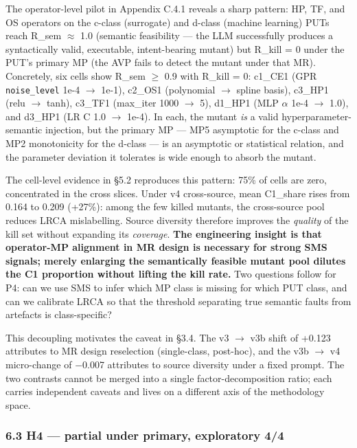 \documentclass[review,12pt,authoryear]{elsarticle}
\begin{document}
The operator-level pilot in Appendix C.4.1 reveals a sharp pattern: HP,
TF, and OS operators on the c-class (surrogate) and d-class (machine
learning) PUTs reach R\_sem $\approx$ 1.0 (semantic feasibility --- the LLM
successfully produces a syntactically valid, executable, intent-bearing
mutant) but R\_kill = 0 under the PUT's primary MP (the AVP fails to
detect the mutant under that MR). Concretely, six cells show R\_sem $\geq$
0.9 with R\_kill = 0: c1\_CE1 (GPR \texttt{noise\_level} 1e-4 $\to$ 1e-1),
c2\_OS1 (polynomial $\to$ spline basis), c3\_HP1 (relu $\to$ tanh), c3\_TF1
(max\_iter 1000 $\to$ 5), d1\_HP1 (MLP $\alpha$ 1e-4 $\to$ 1.0), and d3\_HP1 (LR C 1.0
$\to$ 1e-4). In each, the mutant \emph{is} a valid hyperparameter-semantic
injection, but the primary MP --- MP5 asymptotic for the c-class and MP2
monotonicity for the d-class --- is an asymptotic or statistical
relation, and the parameter deviation it tolerates is wide enough to
absorb the mutant.

The cell-level evidence in §5.2 reproduces this pattern: 75\% of cells
are zero, concentrated in the cross slices. Under v4 cross-source, mean
C1\_share rises from 0.164 to 0.209 (+27\%): among the few killed
mutants, the cross-source pool reduces LRCA mislabelling. Source
diversity therefore improves the \emph{quality} of the kill set without
expanding its \emph{coverage}. \textbf{The engineering insight is that
operator-MP alignment in MR design is necessary for strong SMS signals;
merely enlarging the semantically feasible mutant pool dilutes the C1
proportion without lifting the kill rate.} Two questions follow for P4:
can we use SMS to infer which MP class is missing for which PUT class,
and can we calibrate LRCA so that the threshold separating true semantic
faults from artefacts is class-specific?

This decoupling motivates the caveat in §3.4. The v3 $\to$ v3b shift of
+0.123 attributes to MR design reselection (single-class, post-hoc), and
the v3b $\to$ v4 micro-change of −0.007 attributes to source diversity under
a fixed prompt. The two contrasts cannot be merged into a single
factor-decomposition ratio; each carries independent caveats and lives
on a different axis of the methodology space.

\subsubsection{6.3 H4 --- partial under primary, exploratory
4/4}\label{h4-partial-under-primary-exploratory-44}
\end{document}
